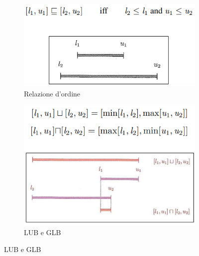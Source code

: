 \documentclass[a4paper,oneside,titlepage]{book}
\begin{document}
\begin{figure}[htp]
	\begin{subfigure}{0.49\textwidth}
	    \centering
		\includegraphics[width=\textwidth, height=\textheight, keepaspectratio]{int2.png}
		\caption{Relazione d'ordine}
	\end{subfigure}
	\hfill
	\begin{subfigure}{0.49\textwidth}
	    \centering
		\includegraphics[width=\textwidth, height=\textheight, keepaspectratio]{int3.png} 
		\caption{LUB e GLB}
	\end{subfigure}
\end{figure}
\end{document}
